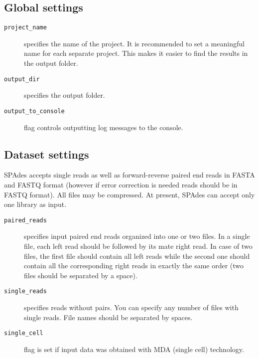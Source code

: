 \documentclass{article}
\def\spades{SPAdes}
\begin{document}
\subsection{Global settings}
\begin{description}
\item[{\tt project\_name}] specifies the name of the project. It is recommended to set a meaningful name for each separate project. This makes it easier to find the results in the output folder.
\item[{\tt output\_dir}] specifies the output folder.
\item[{\tt output\_to\_console}] flag controls outputting log messages to the console.
\end{description}

\subsection{Dataset settings}
{\spades} accepts single reads as well as forward-reverse paired end reads
in FASTA and FASTQ format (however if error correction is needed reads should be in FASTQ format). All files may be compressed.
At present, {\spades} can accept only one library as input.

\begin{description}
\item[{\tt paired\_reads}] specifies input paired end reads organized into one or two files.
In a single file, each left read should be followed by its mate right read. In case of two files, the first file should contain all left reads while the second one should contain all the corresponding right reads in exactly the same order (two files should be separated by a space).
\item[{\tt single\_reads}] specifies reads without pairs. You can specify any number of
files with single reads. File names should be separated by spaces.
\item[{\tt single\_cell}] flag is set if input data was obtained with MDA (single cell) technology.
\end{description}
\end{document}
